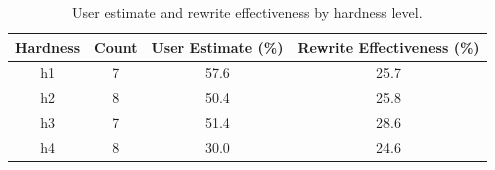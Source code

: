 \begin{table}[htbp]
\vspace{5pt}
\centering
\begin{tabular}{
    c c
    S[table-format=2.1]
    S[table-format=2.1]
}
\toprule
Hardness & Count & {User Estimate (\%)} & {Rewrite Effectiveness (\%)} \\
\midrule
h1 & 7 & 57.6 & 25.7 \\
h2 & 8 & 50.4 & 25.8 \\
h3 & 7 & 51.4 & 28.6 \\
h4 & 8 & 30.0 & 24.6 \\
\bottomrule
\end{tabular}
\vspace{8pt}
\caption{User estimate and rewrite effectiveness by hardness level.}
\label{tab:hardness}
\vspace{-15pt}
\end{table}